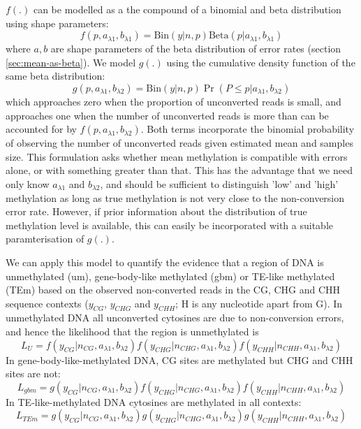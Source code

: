 \documentclass[12pt,longbibliography]{article}
\begin{document}
$f(.)$ can be modelled as a the compound of a binomial and beta distribution using shape parameters:
\begin{equation}
    f(p,a_{\lambda1}, b_{\lambda1}) = 
    \textrm{Bin}(y|n,p)
    \textrm{Beta}(p | a_{\lambda1}, b_{\lambda1})
\end{equation}
where $a, b$ are shape parameters of the beta distribution of error rates (section \ref{sec:mean-as-beta}).
We model $g(.)$ using the cumulative density function of the same beta distribution:
\begin{equation}
    g(p,a_{\lambda1}, b_{\lambda2}) = 
    \textrm{Bin}(y|n,p)
    \Pr( P \leq p | a_{\lambda1}, b_{\lambda2})
\end{equation}
which approaches zero when the proportion of unconverted reads is small, and approaches one when the number of unconverted reads is more than can be accounted for by $ f(p,a_{\lambda1}, b_{\lambda2}) $.
Both terms incorporate the binomial probability of observing the number of unconverted reads given estimated mean and samples size.
This formulation asks whether mean methylation is compatible with errors alone, or with something greater than that.
This has the advantage that we need only know $a_{\lambda1}$ and $b_{\lambda2}$, and should be sufficient to distinguish 'low' and 'high' methylation as long as true methylation is not very close to the non-conversion error rate.
However, if prior information about the distribution of true methylation level is available, this can easily be incorporated with a suitable paramterisation of $g(.)$.

We can apply this model to quantify the evidence that a region of DNA is unmethylated (um), gene-body-like methylated (gbm) or TE-like methylated (TEm) based on the observed non-converted reads in the CG, CHG and CHH sequence contexts ($y_{CG}$, $y_{CHG}$ and $y_{CHH}$; H is any nucleotide apart from G).
In unmethylated DNA all unconverted cytosines are due to non-conversion errors, and hence the likelihood that the region is unmethylated is
\begin{equation}
    L_U =
    f(y_{CG}  | n_{CG},  a_{\lambda1}, b_{\lambda2})
    f(y_{CHG} | n_{CHG}, a_{\lambda1}, b_{\lambda2})
    f(y_{CHH} | n_{CHH}, a_{\lambda1}, b_{\lambda2})
\end{equation}
In gene-body-like-methylated DNA, CG sites are methylated but CHG and CHH sites are not: 
\begin{equation}
    L_{gbm} =
    g(y_{CG}  | n_{CG},  a_{\lambda1}, b_{\lambda2})
    f(y_{CHG} | n_{CHG}, a_{\lambda1}, b_{\lambda2})
    f(y_{CHH} | n_{CHH}, a_{\lambda1}, b_{\lambda2})
\end{equation}
In TE-like-methylated DNA cytosines are methylated in all contexts:
\begin{equation}
    L_{TEm} =
    g(y_{CG}  | n_{CG},  a_{\lambda1}, b_{\lambda2})
    g(y_{CHG} | n_{CHG}, a_{\lambda1}, b_{\lambda2})
    g(y_{CHH} | n_{CHH}, a_{\lambda1}, b_{\lambda2})
\end{equation}
\end{document}
